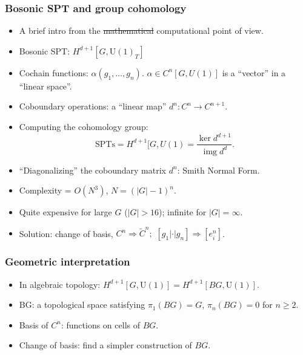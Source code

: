 \documentclass[xcolor=table, 11pt, aspectratio=1610]{beamer}
\newcommand{\uone}{\mathrm U(1)}
\DeclareMathOperator{\img}{img}
\begin{document}
\begin{frame}
  \frametitle{Bosonic SPT and group cohomology}
  \begin{itemize}
  \item A brief intro from the \sout{mathematical} computational point of view.
  \item Bosonic SPT: $H^{d+1}[G, \uone_T]$
  \item Cochain functions: $\alpha(g_1,\ldots,g_n)$. $\alpha \in C^n[G, U(1)]$ is a ``vector'' in a ``linear space''.
  \item Coboundary operations: a ``linear map'' $d^n:C^n\rightarrow C^{n+1}$.
  \item Computing the cohomology group:
    \[\text{SPTs} = H^{d+1}[G, U(1) = \frac{\ker d^{d+1}}{\img d^d}.\]
  \item ``Diagonalizing'' the coboundary matrix $d^n$: Smith Normal Form.
  \item Complexity = $O(N^3)$, $N = (|G|-1)^n$.
  \item Quite expensive for large $G$ ($|G| > 16$); infinite for $|G|=\infty$.
  \item Solution: change of basis, $C^n\Rightarrow \tilde C^n;\,\, [g_1|\cdot|g_n]\Rightarrow [e^n_i]$.
  \end{itemize}
\end{frame}

\begin{frame}
  \frametitle{Geometric interpretation}
  \begin{itemize}
  \item<1-> In algebraic topology:
    $H^{d+1}[G, \uone] = H^{d+1}[BG, \uone]$.
  \item<2-> BG: a topological space satisfying $\pi_1(BG)=G$, $\pi_n(BG)=0$ for $n\geq 2$.
  \item<3-> Basis of $C^n$: functions on cells of $BG$.
  \item<4-> Change of basis: find a simpler construction of $BG$.
  \end{itemize}
  \begin{center}
  \end{center}
\end{frame}
\end{document}

